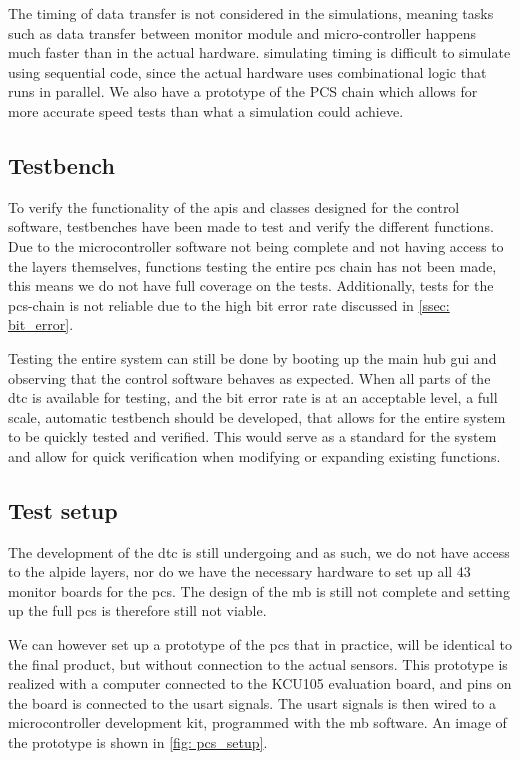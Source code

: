 \documentclass[main.tex]{subfiles}
\begin{document}
The timing of data transfer is not considered in the simulations, meaning tasks such as data transfer between monitor module and micro-controller happens much faster than in the actual hardware. simulating timing is difficult to simulate using sequential code, since the actual hardware uses combinational logic that runs in parallel. We also have a prototype of the PCS chain which allows for more accurate speed tests than what a simulation could achieve. 

\subsection{Testbench}

To verify the functionality of the \gls{api}s and classes designed for the control software, testbenches have been made to test and verify the different functions. Due to the microcontroller software not being complete and not having access to the layers themselves, functions testing the entire \gls{pcs} chain has not been made, this means we do not have full coverage on the tests. Additionally, tests for the \gls{pcs}-chain is not reliable due to the high bit error rate discussed in \autoref{ssec: bit_error}.

Testing the entire system can still be done by booting up the main hub \gls{gui} and observing that the control software behaves as expected. When all parts of the \gls{dtc} is available for testing, and the bit error rate is at an acceptable level, a full scale, automatic testbench should be developed, that allows for the entire system to be quickly tested and verified. This would serve as a standard for the system and allow for quick verification when modifying or expanding existing functions.



\subsection{Test setup}
\label{ssec: test_setup}

The development of the \gls{dtc} is still undergoing and as such, we do not have access to the \gls{alpide} layers, nor do we have the necessary hardware to set up all 43 monitor boards for the \gls{pcs}. The design of the \gls{mb} is still not complete and setting up the full \gls{pcs} is therefore still not viable.

We can however set up a prototype of the \gls{pcs} that in practice, will be identical to the final product, but without connection to the actual sensors. This prototype is realized with a computer connected to the KCU105 evaluation board, and pins on the board is connected to the \gls{usart} signals. The \gls{usart} signals is then wired to a microcontroller development kit, programmed with the \gls{mb} software. An image of the prototype is shown in \autoref{fig: pcs_setup}.
\end{document}
